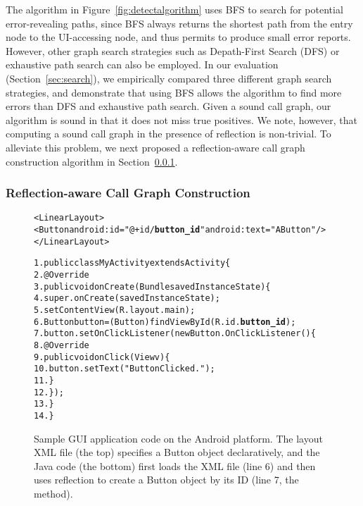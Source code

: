 The algorithm in Figure~\ref{fig:detectalgorithm} uses BFS to search
for potential error-revealing paths, since BFS always returns the
shortest path from the entry node to the UI-accessing node, and thus
permits to produce small error reports. However,
other graph search strategies such as Depath-First Search (DFS) or
exhaustive path search can also be employed. In our evaluation (Section~\ref{sec:search}),
we empirically compared three different graph search strategies, and demonstrate that
using BFS allows the algorithm to find more errors than DFS and
exhaustive path search.
Given a sound call graph, our algorithm is sound in that it does not
miss true positives. We note, however, that computing a sound
call graph in the presence of reflection is non-trivial. 
To alleviate this problem, we next proposed a reflection-aware call graph
construction algorithm in Section~\ref{sec:cg}.

\subsubsection{Reflection-aware Call Graph Construction}
\label{sec:cg}

% 

\begin{figure}[t]
\begin{CodeOut}
\begin{alltt}

<LinearLayout>
    <Button android:id="@+id/\textbf{button\_id}" android:text="A Button" />
</LinearLayout>

1. public class MyActivity extends Activity \{
2.    @Override
3.    public void onCreate(Bundle savedInstanceState) \{
4.        super.onCreate(savedInstanceState);
5.        setContentView(R.layout.main);
6.        Button button = (Button) findViewById(R.id.\textbf{button\_id});
7.        button.setOnClickListener(new Button.OnClickListener() \{
8.            @Override
9.            public void onClick(View v) \{
10.               button.setText("Button Clicked.");
11.           \}
12.       \});
13.   \}
14. \}
\end{alltt}
\end{CodeOut}
\caption{Sample GUI application code on the Android platform. The layout
XML file (the top) specifies a Button object declaratively, 
and the Java code (the bottom)
first loads the XML file (line 6) and then uses reflection to create
a Button object by its ID (line 7, the  method).}
\label{fig:sampleandroid}
\end{figure}




